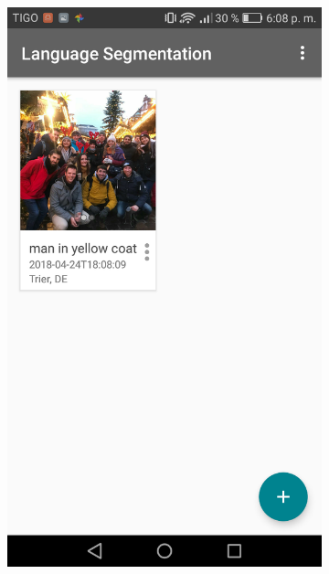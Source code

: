 \begin{figure}[!htbp]
    \centering
    \begin{multicols}{2}
    \begin{subfigure}[b]{\columnwidth}
            \centering
            \includegraphics[width=\textwidth]{./figures/dmn_app/views/6.png}
    \label{subfig:entry_view}
    \end{subfigure}
    

\end{multicols}
\end{figure}
